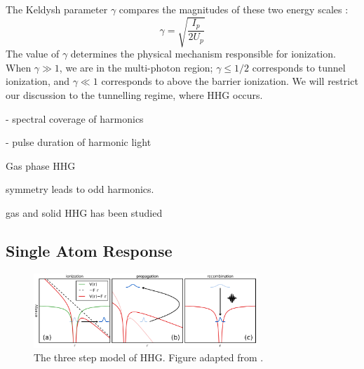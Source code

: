 The Keldysh parameter $\gamma$ compares the magnitudes of these two energy scales \cite{keldyshIonizationFieldStrong1965}:
\begin{equation}
\gamma = \sqrt{\frac{I_p}{2 U_p}}
\end{equation}
The value of $\gamma$ determines the physical mechanism responsible for ionization. When $\gamma \gg 1$, we are in the multi-photon region; $\gamma \le 1/2$ corresponds to tunnel ionization, and $\gamma \ll 1$ corresponds to above the barrier ionization. We will restrict our discussion to the tunnelling regime, where HHG occurs.

- spectral coverage of harmonics

- pulse duration of harmonic light

Gas phase HHG 

symmetry leads to odd harmonics.

gas and solid HHG has been studied

\subsection{Single Atom Response}

\begin{figure}
	\centering
	\includegraphics[width=0.75\textwidth]{figures/chap1/ThreeStepModel.png}
	\caption{The three step model of HHG. Figure adapted from \cite{schounAttosecondHighHarmonicSpectroscopy2015}.}
	\label{fig:ThreeStepModel}
\end{figure}

